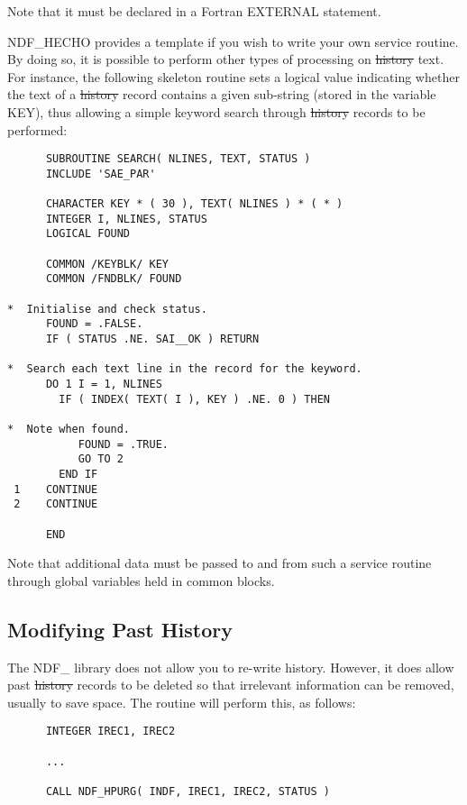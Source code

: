 Note that it must be declared in a Fortran EXTERNAL statement.

NDF\_HECHO provides a template if you wish to write your own service
routine. By doing so, it is possible to perform other types of
processing on \st{history\/} text. For instance, the following skeleton
routine sets a logical value indicating whether the text of a
\st{history\/} record contains a given sub-string (stored in the
variable 
KEY), thus allowing a simple keyword search through \st{history\/}
records to be performed:

\small
\begin{verbatim}
      SUBROUTINE SEARCH( NLINES, TEXT, STATUS )
      INCLUDE 'SAE_PAR'

      CHARACTER KEY * ( 30 ), TEXT( NLINES ) * ( * )
      INTEGER I, NLINES, STATUS
      LOGICAL FOUND

      COMMON /KEYBLK/ KEY
      COMMON /FNDBLK/ FOUND

*  Initialise and check status.
      FOUND = .FALSE.
      IF ( STATUS .NE. SAI__OK ) RETURN

*  Search each text line in the record for the keyword.
      DO 1 I = 1, NLINES
        IF ( INDEX( TEXT( I ), KEY ) .NE. 0 ) THEN

*  Note when found.
           FOUND = .TRUE.
           GO TO 2
        END IF
 1    CONTINUE
 2    CONTINUE

      END
\end{verbatim}
\normalsize

Note that additional data must be passed to and from such a service
routine through global variables held in common blocks.

\subsection{Modifying Past History}

The NDF\_ library does not allow you to re-write history. However, it
does allow past \st{history\/} records to be deleted so that irrelevant
information can be removed, usually to save space. The routine
 will perform this, as follows:

\small
\begin{verbatim}
      INTEGER IREC1, IREC2

      ...

      CALL NDF_HPURG( INDF, IREC1, IREC2, STATUS )
\end{verbatim}
\normalsize

